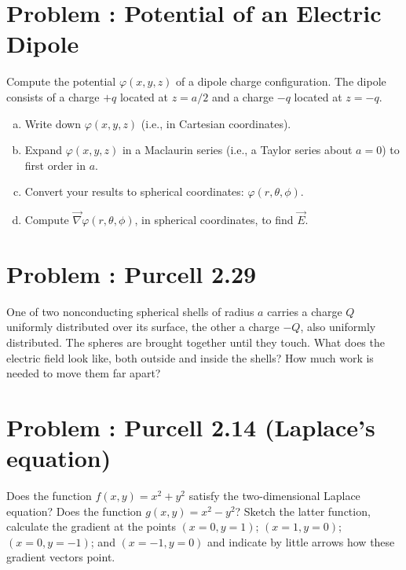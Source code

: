 \documentclass[problems]{esg8022pset}
\begin{document}
\section{Problem \thesection: Potential of an Electric Dipole}
  Compute the potential $\varphi(x,y,z)$ of a dipole charge configuration.  The dipole consists of a charge $+q$ located at $z = a/2$ and a charge $-q$ located at $z=-q$.
  \begin{enumerate}[(a)]
    \item Write down $\varphi(x,y,z)$ (i.e., in Cartesian coordinates).
    \item Expand $\varphi(x,y,z)$ in a Maclaurin series (i.e., a Taylor series about $a=0$) to first order in $a$.
    \item Convert your results to spherical coordinates: $\varphi(r, \theta, \phi)$.
    \item Compute $\vec{\nabla}\varphi(r, \theta, \phi)$, in spherical coordinates, to find $\vec{E}$. %
  \end{enumerate}
\section{Problem \thesection: Purcell 2.29}
  One of two nonconducting spherical shells of radius $a$ carries
  a charge $Q$ uniformly distributed over its surface, the other a charge
  $-Q$, also uniformly distributed. The spheres are brought together
  until they touch. What does the electric field look like, both outside
  and inside the shells? How much work is needed to move them far
  apart?
\section{Problem \thesection: Purcell 2.14 (Laplace's equation)}
  Does the function $f(x, y) = x^2 + y^2$ satisfy the two-dimensional
  Laplace equation? Does the function $g(x, y) = x^2 - y^2$?
  Sketch the latter function, calculate the gradient at the points $(x = 0, y = 1)$;
  $(x = 1, y = 0)$; $(x = 0, y = -1)$; and $(x = -1, y = 0)$ and indicate
  by little arrows how these gradient vectors point.
\end{document}
